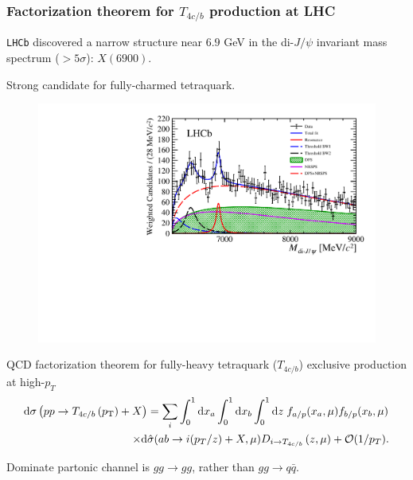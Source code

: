 \begin{frame}
  \frametitle{Factorization theorem for $T_{4c/b}$ production at LHC}

  \begin{itemize}
    \begin{minipage}{0.4\textwidth}
      \item {\tt LHCb} discovered a narrow structure near $6.9$ GeV in the di-$J/\psi$ invariant mass spectrum ($>5\sigma$): $X(6900)$.
      \item Strong candidate for fully-charmed tetraquark.
    \end{minipage}\hfill
    \begin{minipage}{0.5\textwidth}
      \begin{figure}
        \centering
        \includegraphics[width=\textwidth,frame]{Fig3b.pdf}
      \end{figure}
    \end{minipage}
    \item QCD factorization theorem for fully-heavy tetraquark ($T_{4c/b}$) exclusive production at high-$p_T$
          \begin{align}
            \mathrm{d} \sigma\left(p p \rightarrow T_{4c/b}\left(p_{\mathrm{T}}\right)+X\right) & =\sum_{i}\int_0^1 \mathrm{d} x_a  \int_0^1 \mathrm{d} x_b \int_{0}^{1} \mathrm{d} z\; f_{a/p}(x_a,\mu)f_{b/p}(x_b,\mu) \notag \\
            \times  \dd                                                                         & {\hat \sigma}(a b \rightarrow i(p_T/z)+X, \mu)  D_{i \rightarrow T_{4c/b}}\left(z,\mu\right)+{\cal O}(1/p_T).
            \label{QCD:fact:theor}
          \end{align}
    \item Dominate partonic channel is $gg\to gg$, rather than $gg\to q\bar{q}$.
  \end{itemize}

\end{frame}

